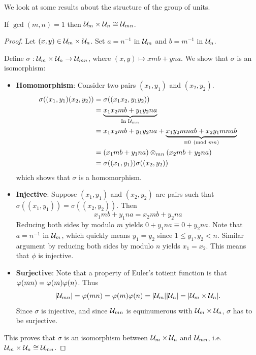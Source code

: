 We look at some results about the structure of the group of units.
\begin{proposition}\label{prop-group-of-units-multiplicative-isomorphism}
    If $\gcd(m, n) = 1$ then $\mathcal{U}_{m} \times \mathcal{U}_{n} \cong \mathcal{U}_{mn}$.
\end{proposition}

\begin{proof}
    Let $(x, y) \in \mathcal{U}_{m} \times \mathcal{U}_{n}$. Set $a = n^{-1}$ in $\mathcal{U}_{m}$ and $b = m^{-1}$ in $\mathcal{U}_{n}$.

    Define $\sigma: \mathcal{U}_{m} \times \mathcal{U}_{n} \to \mathcal{U}_{mn}$, where $(x, y) \mapsto xmb + yna$. We show that $\sigma$ is an isomorphism:
    \begin{itemize}
        \item \textbf{Homomorphism}: Consider two pairs $(x_1, y_1)$ and $(x_2, y_2)$.
            \begin{align*}
                \sigma((x_1, y_1)(x_2, y_2)) &= \sigma((x_1x_2, y_1y_2))\\
                &= \underbrace{x_1x_2mb + y_1y_2na}_{\text{In } \mathcal{U}_{mn}}\\
                &= x_1x_2mb + y_1y_2na + \underbrace{x_1y_2mnab + x_2y_1mnab}_{\equiv 0 \pmod{mn}}\\
                &= (x_1mb + y_1na) \otimes_{mn} (x_2mb + y_2na)\\
                &= \sigma((x_1,y_1))\sigma((x_2,y_2))
            \end{align*}
            which shows that $\sigma$ is a homomorphism.
        \item \textbf{Injective}: Suppose $(x_1, y_1)$ and $(x_2, y_2)$ are pairs such that $\sigma((x_1, y_1)) = \sigma((x_2, y_2))$. Then
        \[
            x_1mb + y_1na = x_2mb + y_2na
        \]
        Reducing both sides by modulo $m$ yields $0 + y_1na \equiv 0 + y_2na$. Note that $a = n^{-1}$ in $\mathcal{U}_{m}$, which quickly means $y_1 = y_2$ since $1 \leq y_1, y_2 < n$. Similar argument by reducing both sides by modulo $n$ yields $x_1 = x_2$. This means that $\phi$ is injective.
        \item \textbf{Surjective}: Note that a property of Euler's totient function is that $\varphi(mn) = \varphi(m)\varphi(n)$. Thus
        \[
            |\mathcal{U}_{mn}| = \varphi(mn) = \varphi(m)\varphi(n) = |\mathcal{U}_{m}||\mathcal{U}_{n}| = |\mathcal{U}_{m} \times \mathcal{U}_{n}|.
        \]
        Since $\sigma$ is injective, and since $\mathcal{U}_{mn}$ is equinumerous with $\mathcal{U}_{m} \times \mathcal{U}_{n}$, $\sigma$ has to be surjective.
    \end{itemize}
    This proves that $\sigma$ is an isomorphism between $\mathcal{U}_{m} \times \mathcal{U}_{n}$ and $\mathcal{U}_{mn}$, i.e. $\mathcal{U}_{m} \times \mathcal{U}_{n} \cong \mathcal{U}_{mn}$.
\end{proof}



